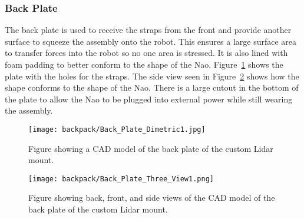 \FloatBarrier

\subsubsection{Back Plate}
The back plate is used to receive the straps from the front and provide another
surface to squeeze the assembly onto the robot. This ensures a large surface
area to transfer forces into the robot so no one area is stressed. It is also
lined with foam padding to better conform to the shape of the Nao.
Figure~\ref{fig:nao_lidar_mount_backplate_dimetric1} shows the plate with the
holes for the straps.
The side view seen in Figure~\ref{fig:nao_lidar_mount_backplate_three_view1}
shows how the shape conforms to the shape of the Nao. There is a large
cutout in the bottom of the plate to allow the Nao to be plugged into external
power while still wearing the assembly.

\begin{figure}[H]
\centering
\texttt{[image: backpack/Back\_Plate\_Dimetric1.jpg]}
\caption{Figure showing a CAD model of the back plate of the custom
         Lidar mount.}
\label{fig:nao_lidar_mount_backplate_dimetric1}
\end{figure}

\begin{figure}[H]
\centering
\texttt{[image: backpack/Back\_Plate\_Three\_View1.png]}
\caption{Figure showing back, front, and side views of the CAD model of the
         back plate of the custom Lidar mount.}
\label{fig:nao_lidar_mount_backplate_three_view1}
\end{figure}


